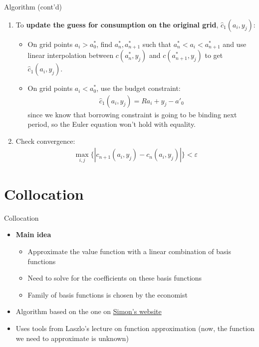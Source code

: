 \documentclass{beamer}
\begin{document}
\begin{frame}{Algorithm (cont'd)}
\begin{enumerate}
\resume
\item To \textbf{update the guess for consumption on the original grid}, $\hat{c}_1(a_i, y_j)$:
\begin{itemize}
\item On grid points $a_i > a_0^*$, find $a_n^*, a_{n+1}^*$ such that $a_n^* < a_i < a_{n+1}^*$ and use linear interpolation between $c(a_n^*, y_j)$ and $c(a_{n+1}^*, y_j)$ to get $\hat{c}_1(a_i, y_j)$.
\item On grid points $a_i < a_0^*$, use the budget constraint:
\begin{align*}
\hat{c}_1(a_i, y_j) = R a_i + y_j - a'_0
\end{align*}
since we know that borrowing constraint is going to be binding next period, so the Euler equation won't hold with equality.
\end{itemize}
\item Check convergence:
\begin{align*}
\max_{i, j} \{|c_{n+1}(a_i, y_j) - c_n(a_i, y_j)| \} < \varepsilon
\end{align*}
\saveenum
\end{enumerate}
\end{frame}

\section{Collocation}

\begin{frame}{Collocation}
\begin{itemize}
\item \textbf{Main idea}
\begin{itemize}
\item Approximate the value function with a linear combination of basis functions
\item Need to solve for the coefficients on these basis functions
\item Family of basis functions is chosen by the economist
\end{itemize}
\item Algorithm based on the one on \href{http://www.simonmongey.com/teaching--notes.html}{Simon's website}
\item Uses tools from Laszlo's lecture on function approximation (now, the function we need to approximate is unknown)
\end{itemize}
\end{frame}
\end{document}
